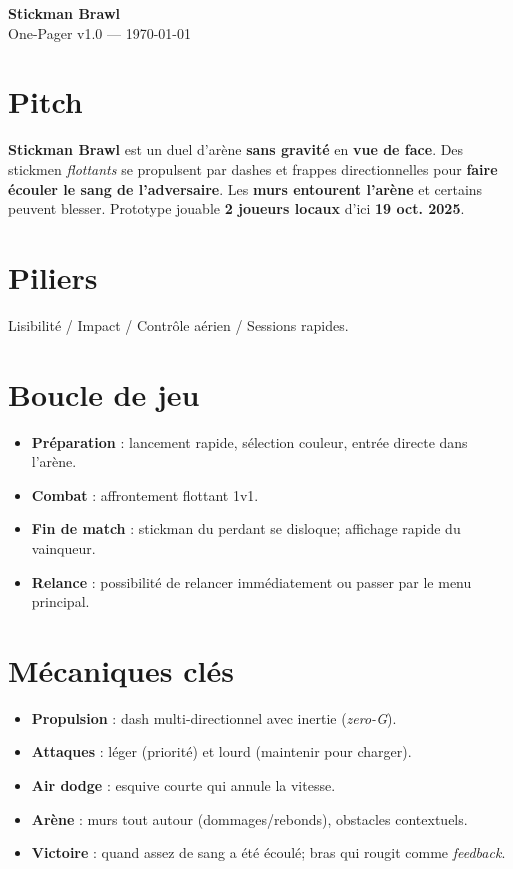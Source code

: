 \documentclass[10.8pt,letterpaper]{article}
\newcommand{\GameTitle}{Stickman Brawl}
\newcommand{\Subtitle}{One-Pager}
\newcommand{\Version}{v1.0 — \today}
\begin{document}
\begin{tcolorbox}
  {\Large \textbf{\GameTitle}}\\[-2pt]
  {\normalsize \Subtitle} \hfill {\footnotesize \Version}
\end{tcolorbox}

\begin{multicols}{2}

\section*{Pitch}
\textbf{Stickman Brawl} est un duel d'arène \textbf{sans gravité} en \textbf{vue de face}. Des stickmen \textit{flottants} se propulsent par dashes et frappes directionnelles pour \textbf{faire écouler le sang de l'adversaire}. Les \textbf{murs entourent l'arène} et certains peuvent blesser. Prototype jouable \textbf{2 joueurs locaux} d'ici \textbf{19 oct. 2025}.

\section*{Piliers}
Lisibilité / Impact / Contrôle aérien / Sessions rapides.

\section*{Boucle de jeu}
\begin{itemize}
  \item \textbf{Préparation} : lancement rapide, sélection couleur, entrée directe dans l'arène.
  \item \textbf{Combat} : affrontement flottant 1v1.
  \item \textbf{Fin de match} : stickman du perdant se disloque; affichage rapide du vainqueur.
  \item \textbf{Relance} : possibilité de relancer immédiatement ou passer par le menu principal.
\end{itemize}

\section*{Mécaniques clés}
\begin{itemize}
  \item \textbf{Propulsion} : dash multi-directionnel avec inertie (\textit{zero-G}).
  \item \textbf{Attaques} : léger (priorité) et lourd (maintenir pour charger).
  \item \textbf{Air dodge} : esquive courte qui annule la vitesse.
  \item \textbf{Arène} : murs tout autour (dommages/rebonds), obstacles contextuels.
  \item \textbf{Victoire} : quand assez de sang a été écoulé; bras qui rougit comme \textit{feedback}.
\end{itemize}


\end{multicols}
\end{document}
